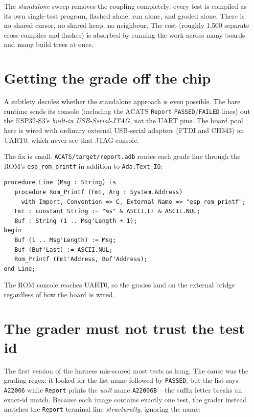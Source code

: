 The \emph{standalone} sweep removes the coupling completely: every test is compiled
as its own single-test program, flashed alone, run alone, and graded alone. There is
no shared cursor, no shared heap, no neighbour. The cost (roughly 1{,}500 separate
cross-compiles and flashes) is absorbed by running the work across many boards and
many build trees at once.

\section{Getting the grade off the chip}

A subtlety decides whether the standalone approach is even possible. The bare runtime
sends its console (including the ACATS \texttt{Report} \texttt{PASSED}/\texttt{FAILED}
lines) out the ESP32-S3's \emph{built-in USB-Serial-JTAG}, not the UART pins. The
board pool here is wired with ordinary external USB-serial adapters (FTDI and CH343)
on UART0, which never see that JTAG console.

The fix is small. \texttt{ACATS/target/report.adb} routes each grade line through the
ROM's \texttt{esp\_rom\_printf} in addition to \texttt{Ada.Text\_IO}:

\begin{lstlisting}
procedure Line (Msg : String) is
   procedure Rom_Printf (Fmt, Arg : System.Address)
     with Import, Convention => C, External_Name => "esp_rom_printf";
   Fmt : constant String := "%s" & ASCII.LF & ASCII.NUL;
   Buf : String (1 .. Msg'Length + 1);
begin
   Buf (1 .. Msg'Length) := Msg;
   Buf (Buf'Last) := ASCII.NUL;
   Rom_Printf (Fmt'Address, Buf'Address);
end Line;
\end{lstlisting}

The ROM console reaches UART0, so the grades land on the external bridge regardless
of how the board is wired.

\section{The grader must not trust the test id}

The first version of the harness mis-scored most tests as hung. The cause was the
grading regex: it looked for the list name followed by \texttt{PASSED}, but the list
says \texttt{A22006} while \texttt{Report} prints the \emph{unit} name \texttt{A22006B}
-- the suffix letter breaks an exact-id match. Because each image contains exactly one
test, the grader instead matches the \texttt{Report} terminal line \emph{structurally},
ignoring the name:

